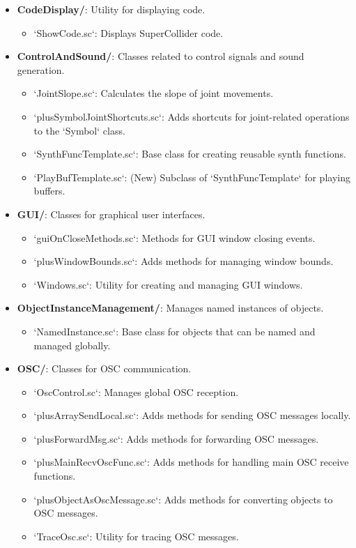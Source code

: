 \documentclass[11pt]{article}
\begin{document}
\begin{itemize}
\item \textbf{CodeDisplay/}: Utility for displaying code.
\begin{itemize}
\item `ShowCode.sc`: Displays SuperCollider code.
\end{itemize}

\item \textbf{ControlAndSound/}: Classes related to control signals and sound generation.
\begin{itemize}
\item `JointSlope.sc`: Calculates the slope of joint movements.
\item `plusSymbolJointShortcuts.sc`: Adds shortcuts for joint-related operations to the `Symbol` class.
\item `SynthFuncTemplate.sc`: Base class for creating reusable synth functions.
\item `PlayBufTemplate.sc`: (New) Subclass of `SynthFuncTemplate` for playing buffers.
\end{itemize}

\item \textbf{GUI/}: Classes for graphical user interfaces.
\begin{itemize}
\item `guiOnCloseMethods.sc`: Methods for GUI window closing events.
\item `plusWindowBounds.sc`: Adds methods for managing window bounds.
\item `Windows.sc`: Utility for creating and managing GUI windows.
\end{itemize}

\item \textbf{ObjectInstanceManagement/}: Manages named instances of objects.
\begin{itemize}
\item `NamedInstance.sc`: Base class for objects that can be named and managed globally.
\end{itemize}

\item \textbf{OSC/}: Classes for OSC communication.
\begin{itemize}
\item `OscControl.sc`: Manages global OSC reception.
\item `plusArraySendLocal.sc`: Adds methods for sending OSC messages locally.
\item `plusForwardMsg.sc`: Adds methods for forwarding OSC messages.
\item `plusMainRecvOscFunc.sc`: Adds methods for handling main OSC receive functions.
\item `plusObjectAsOscMessage.sc`: Adds methods for converting objects to OSC messages.
\item `TraceOsc.sc`: Utility for tracing OSC messages.
\end{itemize}


\end{itemize}
\end{document}
